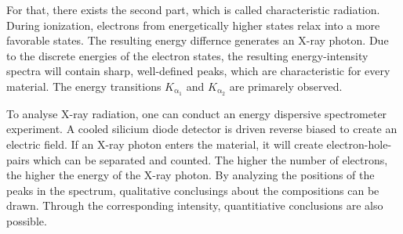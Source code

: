 For that, there exists the second part, which is called characteristic
radiation.
During ionization, electrons from energetically higher states relax
into a more favorable states.
The resulting energy differnce generates an X-ray photon.
Due to the  discrete energies of the electron states,
the resulting energy-intensity spectra will contain sharp, well-defined
peaks, which are characteristic for every material.
The energy transitions $K_{\mathrm{\alpha}_{1}}$ and
$K_{\mathrm{\alpha}_{2}}$ are primarely observed.

To analyse X-ray radiation, one can conduct an energy dispersive
spectrometer experiment.
A cooled silicium diode detector is driven reverse biased to create an
electric field.
If an X-ray photon enters the material, it will create electron-hole-pairs
which can be separated and counted.
The higher the number of electrons, the higher the energy of the X-ray
photon.
By analyzing the positions of the peaks in the spectrum, qualitative
conclusings about the compositions can be drawn.
Through the corresponding intensity, quantitiative conclusions are also
possible.
